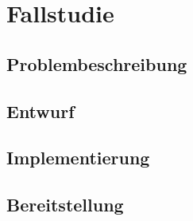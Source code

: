 \section{Fallstudie}


\subsection{Problembeschreibung}


\subsection{Entwurf}


\subsection{Implementierung}


\subsection{Bereitstellung}
